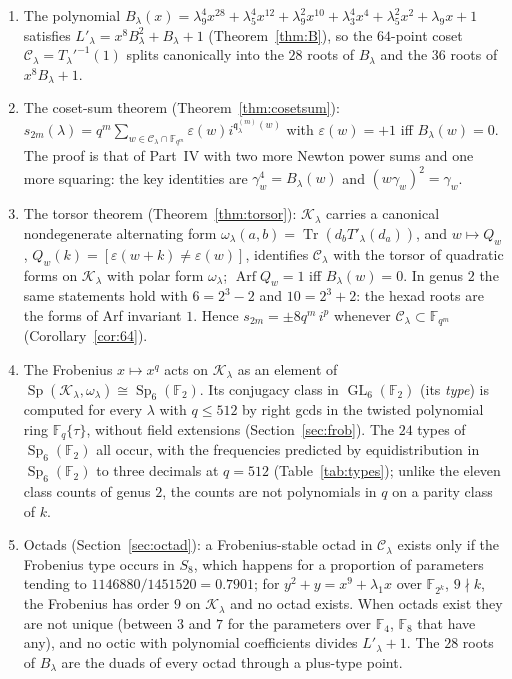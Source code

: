 \documentclass[12pt,a4paper]{amsart}
\theoremstyle{definition}
\newcommand{\F}{\mathbb{F}}
\newcommand{\Tr}{\operatorname{Tr}}
\newcommand{\Sp}{\operatorname{Sp}}
\newcommand{\GL}{\operatorname{GL}}
\newcommand{\Arf}{\operatorname{Arf}}
\newcommand{\eps}{\varepsilon}
\newcommand{\Kk}{\mathcal{K}}
\newcommand{\Cc}{\mathcal{C}}
\newcommand{\qq}{\mathfrak{q}}
\newcommand{\Fq}{\F_{q}}
\begin{document}
\begin{enumerate}[leftmargin=2em]
\item The polynomial $B_\lambda(x)=\lambda_9^4x^{28}+\lambda_5^4x^{12}+\lambda_9^2x^{10}+\lambda_3^4x^4+\lambda_5^2x^2+\lambda_9x+1$ satisfies $L'_\lambda=x^8B_\lambda^2+B_\lambda+1$ (Theorem~\ref{thm:B}), so the $64$-point coset $\Cc_\lambda=T_\lambda'^{-1}(1)$ splits canonically into the $28$ roots of $B_\lambda$ and the $36$ roots of $x^8B_\lambda+1$.
\item The coset-sum theorem (Theorem~\ref{thm:cosetsum}): $s_{2m}(\lambda)=q^m\sum_{w\in\Cc_\lambda\cap\F_{q^m}}\eps(w)i^{\qq^{(m)}_\lambda(w)}$ with $\eps(w)=+1$ iff $B_\lambda(w)=0$. The proof is that of Part~IV with two more Newton power sums and one more squaring: the key identities are $\gamma_w^4=B_\lambda(w)$ and $(w\gamma_w)^2=\gamma_w$.
\item The torsor theorem (Theorem~\ref{thm:torsor}): $\Kk_\lambda$ carries a canonical nondegenerate alternating form $\omega_\lambda(a,b)=\Tr(d_bT'_\lambda(d_a))$, and $w\mapsto Q_w$, $Q_w(k)=[\eps(w+k)\ne\eps(w)]$, identifies $\Cc_\lambda$ with the torsor of quadratic forms on $\Kk_\lambda$ with polar form $\omega_\lambda$; $\Arf Q_w=1$ iff $B_\lambda(w)=0$. In genus $2$ the same statements hold with $6=2^3-2$ and $10=2^3+2$: the hexad roots are the forms of Arf invariant $1$. Hence $s_{2m}=\pm8q^m\,i^p$ whenever $\Cc_\lambda\subset\F_{q^m}$ (Corollary~\ref{cor:64}).
\item The Frobenius $x\mapsto x^q$ acts on $\Kk_\lambda$ as an element of $\Sp(\Kk_\lambda,\omega_\lambda)\cong\Sp_6(\F_2)$. Its conjugacy class in $\GL_6(\F_2)$ (its \emph{type}) is computed for every $\lambda$ with $q\le512$ by right gcds in the twisted polynomial ring $\Fq\{\tau\}$, without field extensions (Section~\ref{sec:frob}). The $24$ types of $\Sp_6(\F_2)$ all occur, with the frequencies predicted by equidistribution in $\Sp_6(\F_2)$ to three decimals at $q=512$ (Table~\ref{tab:types}); unlike the eleven class counts of genus $2$, the counts are not polynomials in $q$ on a parity class of $k$.
\item Octads (Section~\ref{sec:octad}): a Frobenius-stable octad in $\Cc_\lambda$ exists only if the Frobenius type occurs in $S_8$, which happens for a proportion of parameters tending to $1146880/1451520=0.7901$; for $y^2+y=x^9+\lambda_1x$ over $\F_{2^k}$, $9\nmid k$, the Frobenius has order $9$ on $\Kk_\lambda$ and no octad exists. When octads exist they are not unique (between $3$ and $7$ for the parameters over $\F_4$, $\F_8$ that have any), and no octic with polynomial coefficients divides $L'_\lambda+1$. The $28$ roots of $B_\lambda$ are the duads of every octad through a plus-type point.
\end{enumerate}
\end{document}
